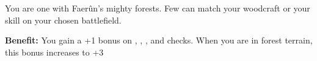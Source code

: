 
You are one with Faerûn’s mighty forests. Few can match your woodcraft or your skill on your chosen battlefield.

\textbf{Benefit:} You gain a +1 bonus on , , , and  checks. When you are in forest terrain, this bonus increases to +3